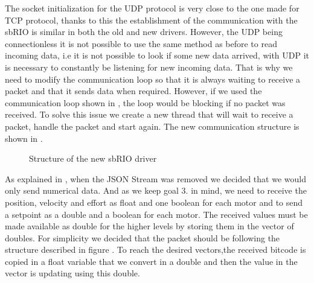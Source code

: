 The socket initialization for the UDP protocol is very close to the one made for TCP protocol, thanks to this the establishment of the communication with the sbRIO is similar in both the old and new drivers. However, the UDP being connectionless it is not possible to use the same method as before to read incoming data, i.e it is not possible to look if some new data arrived, with UDP it is necessary to constantly be listening for new incoming data. That is why we need to modify the communication loop so that it is always waiting to receive a packet and that it sends data when required. However, if we used the communication loop shown in , the loop would be blocking if no packet was received. To solve this issue we create a new thread that will wait to receive a packet, handle the packet and start again. The new communication structure is shown in .

\begin{figure}[H]
\centering
{}
\caption{Structure of the new sbRIO driver}
\label{new_driver}
\end{figure}

As explained in , when the JSON Stream was removed we decided that we would only send numerical data. And as we keep goal 3. in mind, we need to receive the position, velocity and effort as float and one boolean for each motor and to send a setpoint as a double and a boolean for each motor.
The received values must be made available as double for the higher levels by storing them in the vector of doubles. For simplicity we decided that the packet should be following the structure described in figure . To reach the desired vectors,the received bitcode is copied in a float variable that we convert in a double and then the value in the vector is updating using this double.

